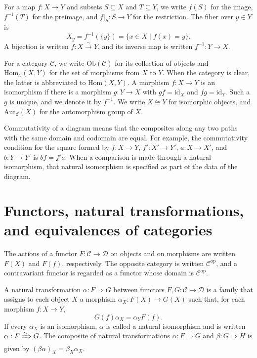 For a map $f:X\to Y$ and subsets $S\subseteq X$ and $T\subseteq Y$, we write
$f(S)$ for the image, $f^{-1}(T)$ for the preimage, and $f|_S:S\to Y$ for the
restriction. The fiber over $y\in Y$ is
\[
X_y=f^{-1}(\{y\})=\{x\in X\mid f(x)=y\}.
\]
A bijection is written $f:X\xrightarrow{\sim}Y$, and its inverse map is
written $f^{-1}:Y\to X$.

For a category $\mathcal{C}$, we write $\mathrm{Ob}(\mathcal{C})$ for its
collection of objects and $\mathrm{Hom}_{\mathcal{C}}(X,Y)$ for the set of
morphisms from $X$ to $Y$. When the category is clear, the latter is
abbreviated to $\mathrm{Hom}(X,Y)$. A morphism $f:X\to Y$ is an isomorphism if
there is a morphism $g:Y\to X$ with $gf=\mathrm{id}_X$ and
$fg=\mathrm{id}_Y$. Such a $g$ is unique, and we denote it by $f^{-1}$. We write
$X\cong Y$ for isomorphic objects, and $\mathrm{Aut}_{\mathcal{C}}(X)$ for the
automorphism group of $X$.

Commutativity of a diagram means that the composites along any two paths with
the same domain and codomain are equal. For example, the commutativity
condition for the square formed by $f:X\to Y$, $f':X'\to Y'$,
$a:X\to X'$, and $b:Y\to Y'$ is $bf=f'a$. When a comparison is made through a natural isomorphism, that natural
isomorphism is specified as part of the data of the diagram.

\section[Functors, natural transformations, and equivalences of
categories]{Functors, natural transformations,\texorpdfstring{\\}{ }and
equivalences of categories}\label{sec:P.3}

The actions of a functor $F:\mathcal{C}\to\mathcal{D}$ on objects and on
morphisms are written $F(X)$ and $F(f)$, respectively. The opposite category is written
$\mathcal{C}^{\mathrm{op}}$, and a contravariant functor is regarded as a
functor whose domain is $\mathcal{C}^{\mathrm{op}}$.

A natural transformation $\alpha:F\Rightarrow G$ between functors
$F,G:\mathcal{C}\to\mathcal{D}$ is a family that assigns to each object $X$ a
morphism $\alpha_X:F(X)\to G(X)$ such that, for each morphism $f:X\to Y$,
\[
G(f)\alpha_X=\alpha_YF(f).
\]
If every $\alpha_X$ is an isomorphism, $\alpha$ is called a natural
isomorphism and is written $\alpha:F\xRightarrow{\sim}G$. The composite of
natural transformations $\alpha:F\Rightarrow G$ and $\beta:G\Rightarrow H$ is
given by $(\beta\alpha)_X=\beta_X\alpha_X$.

